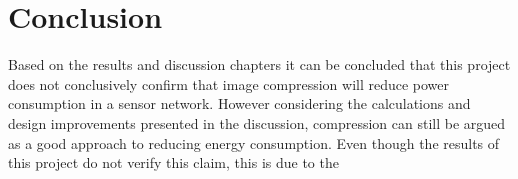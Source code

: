 \chapter{Conclusion}

Based on the results and discussion chapters it can be concluded that this project does not conclusively confirm that image compression will reduce power consumption in a sensor network. However considering the calculations and design improvements presented in the discussion, compression can still be argued as a good approach to reducing energy consumption. Even though the results of this project do not verify this claim, this is due to the 
